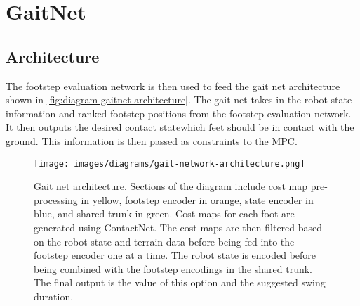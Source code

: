 \section{GaitNet}

\subsection{Architecture}

The footstep evaluation network is then used to feed the gait net
architecture shown in \autoref{fig:diagram-gaitnet-architecture}. The
gait net takes in the robot state information and ranked footstep
positions from the footstep evaluation network. It then outputs the
desired contact state\textemdash which feet should be in contact with
the ground. This information is then passed as constraints to the MPC.

\begin{figure}[H]
  \centering
  \texttt{[image: images/diagrams/gait-network-architecture.png]}
  \caption{Gait net architecture. Sections of the diagram include
    cost map pre-processing in yellow, footstep encoder in orange,
    state encoder in blue, and shared trunk in green. Cost maps for each
    foot are generated using ContactNet. The cost maps are then
    filtered based on the robot state and terrain data before being fed
    into the footstep encoder one at a time. The robot state is encoded
    before being combined with the footstep encodings in the shared
    trunk. The final output is the value of this option and the
  suggested swing duration.}
  \label{fig:diagram-gaitnet-architecture}
\end{figure}

